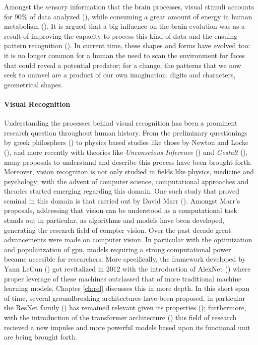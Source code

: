 Amongst the sensory information that the brain processes, visual stimuli accounts 
for 90\% of data analyzed (\cite{potter2014detecting}), while consuming a great amount of energy 
in human metabolism (\cite{phelps1981metabolic}). It is argued that a big influence on the 
brain evolution was as a result of improving the capacity to process this kind of data and the 
ensuing  pattern recognition (\cite{mattson2014superior}). 
In current time, these shapes and forms have evolved too: it is no longer common for a human
the need to scan the environment for faces that could reveal a potential predator; for a change, 
the patterns that we now seek to unravel are a product of our own imagination: digits and 
characters, geometrical shapes.\\

\paragraph{Visual Recognition} Understanding the processes behind visual recognition has been a 
prominent research question throughout human history. From the preliminary questionings by greek  
philosphers (\cite{finger2001origins}) to physics based studies like those by Newton and Locke 
(\cite{swenson2010optics}), and more recently with theories like \textit{Unconscious Inference} 
(\cite{gullstrand1909hemholtz}) and \textit{Gestalt} (\cite{wagemans2012century}), many proposals 
to understand and describe this process have been brought forth. Moreover, vision recogniton is not 
only studied in fields like physics, medicine and psychology; 
with the advent of computer science, computational approaches and theories started emerging 
regarding this domain. One such study that proved seminal in this domain is that carried out by 
David Marr (\cite{poggio1981marr}). Amongst Marr's proposals, addressing that vision can be 
understood as a computational task stands out in particular, as algorithms and models have been 
developed, generating the research field of compter vision.
Over the past decade great advancements were made on computer vision. In particular with the 
optimization and popularization of \gls{gpu}, models requiring a strong computational power became 
accesible for researchers. More specifically, the framework developed by Yann LeCun 
(\cite{lecun1998gradient}) got revitalized in 2012 with the introduction of AlexNet 
(\cite{krizhevsky2012imagenet}) where proper leverage of these machines outclassed that of 
more traditional machine learning models, Chapter \ref{ch:rel} discusses this in more depth. 
In this short span of time, several groundbreaking architectures have been proposed, in 
particular the ResNet family (\cite{he2016deep}) has remained relevant given its properties
(\cite{wightman2021resnet}); furthermore, with the introduction of the transformer architecture 
(\cite{vaswani2017attention}) this field of research recieved a new impulse and more powerful models 
based upon its functional unit are being brought forth.\\

